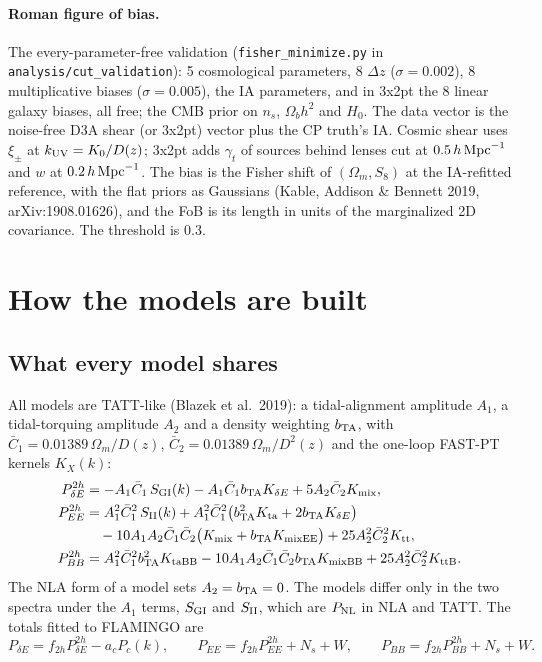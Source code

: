 \documentclass[11pt]{article}
\newcommand{\hMpc}{\,h\,{\rm Mpc}^{-1}}
\newcommand{\PNL}{P_{\rm NL}}
\newcommand{\bTA}{b_{\rm TA}}
\newcommand{\Cb}{\bar C_1}
\newcommand{\Cbb}{\bar C_2}
\newcommand{\GtCut}{0.5}           %
\newcommand{\WCut}{0.2}            %
\begin{document}
\paragraph{Roman figure of bias.} The every-parameter-free validation
(\texttt{fisher\_minimize.py} in \texttt{analysis/cut\_validation}): 5 cosmological
parameters, 8 $\Delta z$ ($\sigma = 0.002$), 8 multiplicative biases
($\sigma = 0.005$), the IA parameters, and in 3x2pt the 8 linear galaxy biases,
all free; the CMB prior on $n_s$, $\Omega_bh^2$ and $H_0$. The data vector is
the noise-free D3A shear (or 3x2pt) vector plus the CP truth's IA. Cosmic
shear uses $\xi_\pm$ at $k_{\rm UV} = K_0/D(z)$; 3x2pt adds $\gamma_t$ of
sources behind lenses cut at $\GtCut\hMpc$ and $w$ at $\WCut\hMpc$. The bias
is the Fisher shift of $(\Omega_m, S_8)$ at the IA-refitted reference, with
the flat priors as Gaussians (Kable, Addison \& Bennett 2019,
arXiv:1908.01626), and the FoB is its length in units of the marginalized 2D
covariance. The threshold is 0.3.

\section{How the models are built}
\label{sec:models}

\subsection{What every model shares}

All models are TATT-like (Blazek et al.\ 2019): a tidal-alignment amplitude
$A_1$, a tidal-torquing amplitude $A_2$ and a density weighting $\bTA$, with
$\Cb = 0.01389\,\Omega_m/D(z)$, $\Cbb = 0.01389\,\Omega_m/D^2(z)$ and the
one-loop FAST-PT kernels $K_X(k)$:
\begin{align}
P^{2h}_{\delta E} &= -A_1\Cb\,S_{\rm GI}(k) - A_1\Cb\bTA K_{\delta E} + 5A_2\Cbb K_{\rm mix},\label{eq:gi}\\
P^{2h}_{EE} &= A_1^2\Cb^2\,S_{\rm II}(k) + A_1^2\Cb^2\big(\bTA^2K_{\rm ta} + 2\bTA K_{\delta E}\big)\nonumber\\
 &\quad - 10A_1A_2\Cb\Cbb\big(K_{\rm mix} + \bTA K_{\rm mixEE}\big) + 25A_2^2\Cbb^2K_{\rm tt},\label{eq:ii}\\
P^{2h}_{BB} &= A_1^2\Cb^2\bTA^2K_{\rm taBB} - 10A_1A_2\Cb\Cbb\bTA K_{\rm mixBB} + 25A_2^2\Cbb^2K_{\rm ttB}.
\end{align}
The NLA form of a model sets $A_2 = \bTA = 0$. The models differ only in the
two spectra under the $A_1$ terms, $S_{\rm GI}$ and $S_{\rm II}$, which are
$\PNL$ in NLA and TATT. The totals fitted to FLAMINGO are
\begin{equation}
P_{\delta E} = f_{2h}P^{2h}_{\delta E} - a_cP_c(k),\qquad
P_{EE} = f_{2h}P^{2h}_{EE} + N_s + W,\qquad
P_{BB} = f_{2h}P^{2h}_{BB} + N_s + W .
\end{equation}
\end{document}
